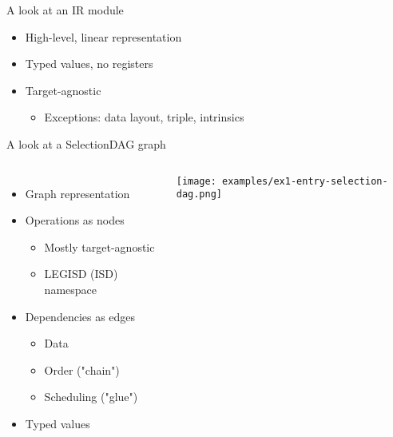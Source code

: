 
\begin{frame}[fragile]{A look at an IR module}

\begin{itemize}
    \item High-level, linear representation
    \item Typed values, no registers
    \item Target-agnostic
    \begin{itemize}
        \item Exceptions: data layout, triple, intrinsics
    \end{itemize}
\end{itemize}


\end{frame}


\begin{frame}{A look at a SelectionDAG graph}

\begin{columns}[t]
    \begin{itemize}
        \item Graph representation
        \item Operations as nodes
        \begin{itemize}
            \item Mostly target-agnostic
            \item LEGISD (ISD) namespace
        \end{itemize}
        \item Dependencies as edges
        \begin{itemize}
            \item Data
            \item Order ("chain")
            \item Scheduling ("glue")
        \end{itemize}
        \item Typed values
    \end{itemize}
    \begin{block}{}
        \texttt{[image: examples/ex1-entry-selection-dag.png]}
    \end{block}
\end{columns}

\end{frame}

